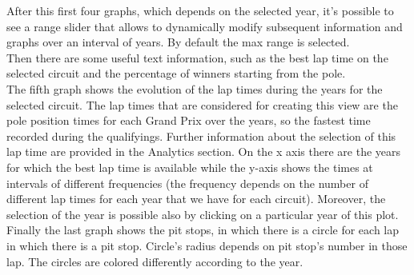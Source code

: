 \documentclass[11pt,twocolumn,letterpaper]{article}
\begin{document}
After this first four graphs, which depends on the selected year, it's possible to see a range slider that allows to dynamically modify subsequent information and graphs over an interval of years. By default the max range is selected. \\
Then there are some useful text information, such as the best lap time on the selected circuit and the percentage of winners starting from the pole. \\
The fifth graph shows the evolution of the lap times during the years for the selected circuit. The lap times that are considered for creating this view are the pole position times for each Grand Prix over the years, so the fastest time recorded during the qualifyings. Further information about the selection of this lap time are provided in the Analytics section. On the x axis there are the years for which the best lap time is available while the y-axis shows the times at intervals of different frequencies (the frequency depends on the number of different lap times for each year that we have for each circuit). Moreover, the selection of the year is possible also by clicking on a particular year of this plot.\\
Finally the last graph shows the pit stops, in which there is a circle for each lap in which there is a pit stop. Circle's radius depends on pit stop's number in those lap. The circles are colored differently according to the year.
\end{document}
